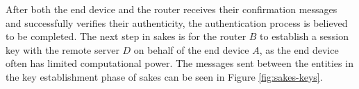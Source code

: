 





After both the end device and the router receives their confirmation messages and successfully verifies their authenticity, the authentication process is believed to be completed. The next step in \gls{sakes} is for the router $B$ to establish a session key with the remote server $D$ on behalf of the end device $A$, as the end device often has limited computational power. The messages sent between the entities in the key establishment phase of \gls{sakes} can be seen in Figure \ref{fig:sakes-keys}.

